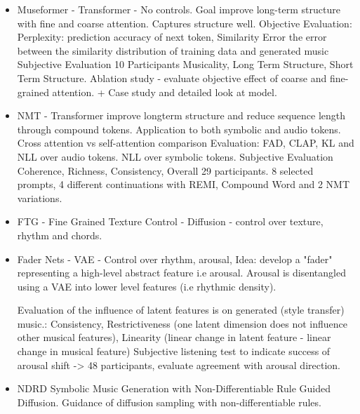 \begin{itemize}
\item{Museformer} \cite{Yu_Lu_Wang_Hu_Tan_Ye_Zhang_museformer_2022} - Transformer - No controls. Goal improve long-term structure with fine and coarse attention. Captures structure well. 
Objective Evaluation: Perplexity: prediction accuracy of next token, Similarity Error the error between the similarity distribution of training data and generated
music 
Subjective Evaluation 10 Participants Musicality, Long Term Structure, Short Term Structure.
Ablation study - evaluate objective effect of coarse and fine-grained attention. + Case study and detailed look at model.

\item{NMT} \cite{Ryu_Dong_nested_2024} - Transformer improve longterm structure and reduce sequence length through compound tokens. Application to both symbolic and audio tokens. 
Cross attention vs self-attention comparison 
Evaluation: FAD, CLAP, KL and NLL over audio tokens. NLL over symbolic tokens. 
Subjective Evaluation Coherence, Richness, Consistency, Overall 29 participants. 8 selected prompts, 4 different continuations with REMI, Compound Word and 2 NMT variations.


\item{FTG - Fine Grained Texture Control} - Diffusion - control over texture, rhythm and chords. 

\item{Fader Nets}\cite{Tan_Herremans_2020} - VAE - Control over rhythm, arousal, 
Idea: develop a "fader" representing a high-level abstract feature i.e arousal. Arousal is disentangled using a VAE into lower level features (i.e rhythmic density).

Evaluation of the influence of latent features is on generated (style transfer) music.:
Consistency, Restrictiveness (one latent dimension does not influence other musical features), Linearity (linear change in latent feature - linear change in musical feature)
Subjective listening test to indicate success of arousal shift -> 48 participants, evaluate agreement with arousal direction. 

\item{NDRD} Symbolic Music Generation with Non-Differentiable Rule Guided Diffusion.
Guidance of diffusion sampling with non-differentiable rules. 
\end{itemize}
